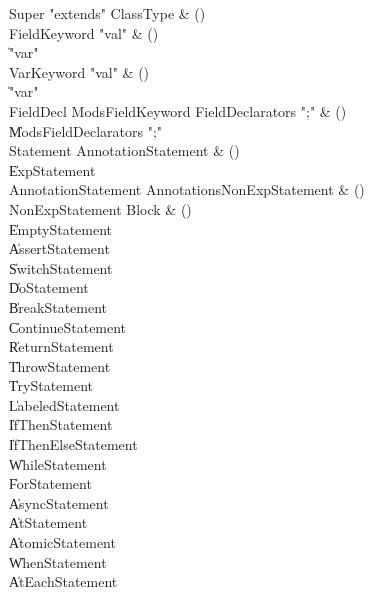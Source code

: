\begin{bbgrammar}

 Super  \label{prod:Super}  \: \xcd"extends" ClassType & ()\\
 FieldKeyword  \label{prod:FieldKeyword}  \: \xcd"val" & ()\\
    \| \xcd"var"\\
 VarKeyword  \label{prod:VarKeyword}  \: \xcd"val" & ()\\
    \| \xcd"var"\\
 FieldDecl  \label{prod:FieldDecl}  \: Mods\opt FieldKeyword FieldDeclarators \xcd";" & ()\\
    \| Mods\opt FieldDeclarators \xcd";"\\
 Statement  \label{prod:Statement}  \: AnnotationStatement & ()\\
    \| ExpStatement\\
 AnnotationStatement  \label{prod:AnnotationStatement}  \: Annotations\opt NonExpStatement & ()\\
 NonExpStatement  \label{prod:NonExpStatement}  \: Block & ()\\
    \| EmptyStatement\\
    \| AssertStatement\\
    \| SwitchStatement\\
    \| DoStatement\\
    \| BreakStatement\\
    \| ContinueStatement\\
    \| ReturnStatement\\
    \| ThrowStatement\\
    \| TryStatement\\
    \| LabeledStatement\\
    \| IfThenStatement\\
    \| IfThenElseStatement\\
    \| WhileStatement\\
    \| ForStatement\\
    \| AsyncStatement\\
    \| AtStatement\\
    \| AtomicStatement\\
    \| WhenStatement\\
    \| AtEachStatement\\

\end{bbgrammar}

